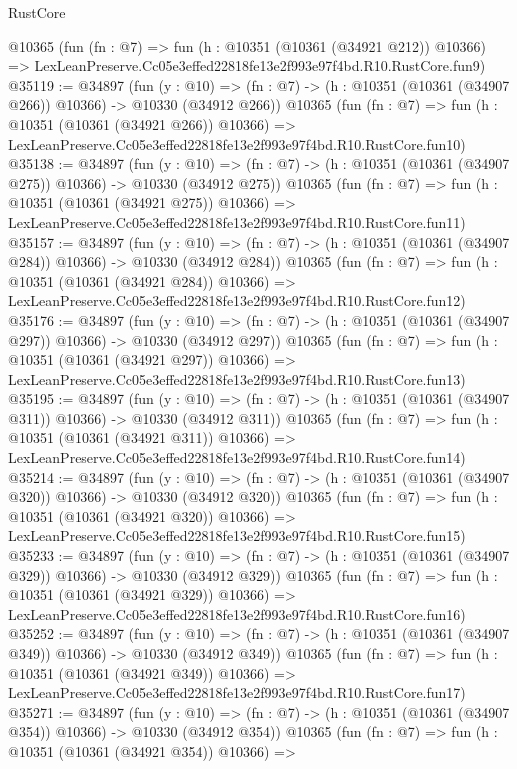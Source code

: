 \begin{lexlean}{RustCore}
\begin{coremodule}
    @10365
    (fun (fn : @7) =>
    fun (h : @10351 (@10361 (@34921 @212)) @10366) =>
    LexLeanPreserve.Cc05e3effed22818fe13e2f993e97f4bd.R10.RustCore.fun9)
@35119 := @34897
    (fun (y : @10) =>
    (fn : @7) -> (h : @10351 (@10361 (@34907 @266)) @10366) -> @10330 (@34912 @266))
    @10365
    (fun (fn : @7) =>
    fun (h : @10351 (@10361 (@34921 @266)) @10366) =>
    LexLeanPreserve.Cc05e3effed22818fe13e2f993e97f4bd.R10.RustCore.fun10)
@35138 := @34897
    (fun (y : @10) =>
    (fn : @7) -> (h : @10351 (@10361 (@34907 @275)) @10366) -> @10330 (@34912 @275))
    @10365
    (fun (fn : @7) =>
    fun (h : @10351 (@10361 (@34921 @275)) @10366) =>
    LexLeanPreserve.Cc05e3effed22818fe13e2f993e97f4bd.R10.RustCore.fun11)
@35157 := @34897
    (fun (y : @10) =>
    (fn : @7) -> (h : @10351 (@10361 (@34907 @284)) @10366) -> @10330 (@34912 @284))
    @10365
    (fun (fn : @7) =>
    fun (h : @10351 (@10361 (@34921 @284)) @10366) =>
    LexLeanPreserve.Cc05e3effed22818fe13e2f993e97f4bd.R10.RustCore.fun12)
@35176 := @34897
    (fun (y : @10) =>
    (fn : @7) -> (h : @10351 (@10361 (@34907 @297)) @10366) -> @10330 (@34912 @297))
    @10365
    (fun (fn : @7) =>
    fun (h : @10351 (@10361 (@34921 @297)) @10366) =>
    LexLeanPreserve.Cc05e3effed22818fe13e2f993e97f4bd.R10.RustCore.fun13)
@35195 := @34897
    (fun (y : @10) =>
    (fn : @7) -> (h : @10351 (@10361 (@34907 @311)) @10366) -> @10330 (@34912 @311))
    @10365
    (fun (fn : @7) =>
    fun (h : @10351 (@10361 (@34921 @311)) @10366) =>
    LexLeanPreserve.Cc05e3effed22818fe13e2f993e97f4bd.R10.RustCore.fun14)
@35214 := @34897
    (fun (y : @10) =>
    (fn : @7) -> (h : @10351 (@10361 (@34907 @320)) @10366) -> @10330 (@34912 @320))
    @10365
    (fun (fn : @7) =>
    fun (h : @10351 (@10361 (@34921 @320)) @10366) =>
    LexLeanPreserve.Cc05e3effed22818fe13e2f993e97f4bd.R10.RustCore.fun15)
@35233 := @34897
    (fun (y : @10) =>
    (fn : @7) -> (h : @10351 (@10361 (@34907 @329)) @10366) -> @10330 (@34912 @329))
    @10365
    (fun (fn : @7) =>
    fun (h : @10351 (@10361 (@34921 @329)) @10366) =>
    LexLeanPreserve.Cc05e3effed22818fe13e2f993e97f4bd.R10.RustCore.fun16)
@35252 := @34897
    (fun (y : @10) =>
    (fn : @7) -> (h : @10351 (@10361 (@34907 @349)) @10366) -> @10330 (@34912 @349))
    @10365
    (fun (fn : @7) =>
    fun (h : @10351 (@10361 (@34921 @349)) @10366) =>
    LexLeanPreserve.Cc05e3effed22818fe13e2f993e97f4bd.R10.RustCore.fun17)
@35271 := @34897
    (fun (y : @10) =>
    (fn : @7) -> (h : @10351 (@10361 (@34907 @354)) @10366) -> @10330 (@34912 @354))
    @10365
    (fun (fn : @7) =>
    fun (h : @10351 (@10361 (@34921 @354)) @10366) =>

\end{coremodule}
\end{lexlean}
